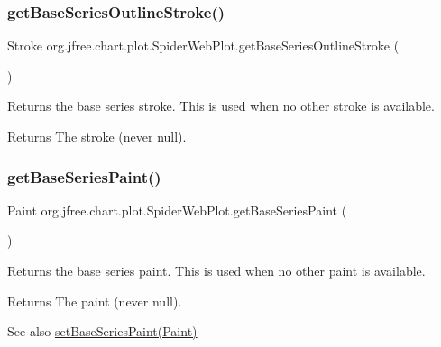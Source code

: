 \subsubsection{\texorpdfstring{get\+Base\+Series\+Outline\+Stroke()}{getBaseSeriesOutlineStroke()}}
{\footnotesize\ttfamily Stroke org.\+jfree.\+chart.\+plot.\+Spider\+Web\+Plot.\+get\+Base\+Series\+Outline\+Stroke (\begin{DoxyParamCaption}{ }\end{DoxyParamCaption})}

Returns the base series stroke. This is used when no other stroke is available.

\begin{DoxyReturn}{Returns}
The stroke (never {\ttfamily null}). 
\end{DoxyReturn}
\mbox{\label{classorg_1_1jfree_1_1chart_1_1plot_1_1_spider_web_plot_ad894e0dd3eaa6a2d887f6d18f724cc30}} 
\subsubsection{\texorpdfstring{get\+Base\+Series\+Paint()}{getBaseSeriesPaint()}}
{\footnotesize\ttfamily Paint org.\+jfree.\+chart.\+plot.\+Spider\+Web\+Plot.\+get\+Base\+Series\+Paint (\begin{DoxyParamCaption}{ }\end{DoxyParamCaption})}

Returns the base series paint. This is used when no other paint is available.

\begin{DoxyReturn}{Returns}
The paint (never {\ttfamily null}).
\end{DoxyReturn}
\begin{DoxySeeAlso}{See also}
\mbox{\hyperlink{classorg_1_1jfree_1_1chart_1_1plot_1_1_spider_web_plot_ab62b188899ac692b78f78765ad0d0e1b}{set\+Base\+Series\+Paint(\+Paint)}} 
\end{DoxySeeAlso}
\mbox{\label{classorg_1_1jfree_1_1chart_1_1plot_1_1_spider_web_plot_a858c1204ab0567e08d765226ff57d2b3}} 
